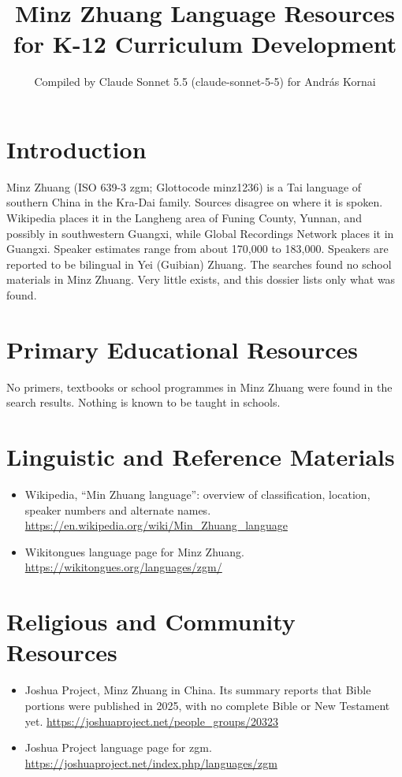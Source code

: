 \documentclass[12pt]{article}
\title{Minz Zhuang Language Resources for K-12 Curriculum Development}
\author{Compiled by Claude Sonnet 5.5 (claude-sonnet-5-5) for Andr\'as Kornai}
\date{}
\begin{document}
\maketitle

\section{Introduction}
Minz Zhuang (ISO 639-3 zgm; Glottocode minz1236) is a Tai language of southern China in the Kra-Dai family. Sources disagree on where it is spoken. Wikipedia places it in the Langheng area of Funing County, Yunnan, and possibly in southwestern Guangxi, while Global Recordings Network places it in Guangxi. Speaker estimates range from about 170,000 to 183,000. Speakers are reported to be bilingual in Yei (Guibian) Zhuang. The searches found no school materials in Minz Zhuang. Very little exists, and this dossier lists only what was found.

\section{Primary Educational Resources}
No primers, textbooks or school programmes in Minz Zhuang were found in the search results. Nothing is known to be taught in schools.

\section{Linguistic and Reference Materials}
\begin{itemize}
\item Wikipedia, ``Min Zhuang language'': overview of classification, location, speaker numbers and alternate names. \url{https://en.wikipedia.org/wiki/Min_Zhuang_language}
\item Wikitongues language page for Minz Zhuang. \url{https://wikitongues.org/languages/zgm/}
\end{itemize}

\section{Religious and Community Resources}
\begin{itemize}
\item Joshua Project, Minz Zhuang in China. Its summary reports that Bible portions were published in 2025, with no complete Bible or New Testament yet. \url{https://joshuaproject.net/people_groups/20323}
\item Joshua Project language page for zgm. \url{https://joshuaproject.net/index.php/languages/zgm}
\end{itemize}
\end{document}
